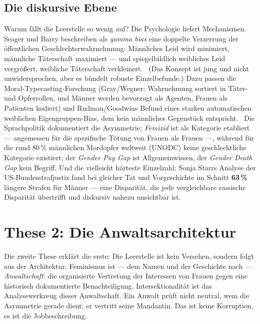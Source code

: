 \subsection{Die diskursive Ebene}

Warum fällt die Leerstelle so wenig auf? Die Psychologie liefert Mechanismen.
Seager und Barry beschreiben als \emph{gamma bias} eine doppelte Verzerrung
der öffentlichen Geschlechterwahrnehmung: Männliches Leid wird minimiert,
männliche Täterschaft maximiert --- und spiegelbildlich weibliches Leid
vergrößert, weibliche Täterschaft verkleinert. \umstritten\ (Das Konzept ist
jung und nicht unwidersprochen, aber es bündelt robuste Einzelbefunde.)
Dazu passen die Moral-Typecasting-Forschung (Gray/Wegner: Wahrnehmung sortiert
in Täter- und Opferrollen, und Männer werden bevorzugt als Agenten, Frauen als
Patienten kodiert) und Rudman/Goodwins Befund eines starken automatischen
weiblichen Eigengruppen-Bias, dem kein männliches Gegenstück entspricht.
\belegt\ Die Sprachpolitik dokumentiert die Asymmetrie: \emph{Femizid} ist als
Kategorie etabliert --- angemessen für die spezifische Tötung von Frauen als
Frauen ---, während für die rund 80\,\% männlichen Mordopfer weltweit (UNODC)
keine geschlechtliche Kategorie existiert; der \emph{Gender Pay Gap} ist
Allgemeinwissen, der \emph{Gender Death Gap} kein Begriff. Und die vielleicht
härteste Einzelzahl: Sonja Starrs Analyse der US-Bundesstrafjustiz fand bei
gleicher Tat und Vorgeschichte im Schnitt \textbf{63\,\%} längere Strafen für
Männer --- eine Disparität, die jede vergleichbare rassische Disparität
übertrifft und diskursiv nahezu unsichtbar ist. \belegt

\section{These 2: Die Anwaltsarchitektur}

Die zweite These erklärt die erste: Die Leerstelle ist kein Versehen, sondern
folgt aus der Architektur. Feminismus ist --- dem Namen und der Geschichte nach
--- \emph{Anwaltschaft}: die organisierte Vertretung der Interessen von Frauen
gegen eine historisch dokumentierte Benachteiligung. Intersektionalität ist
das Analysewerkzeug dieser Anwaltschaft. Ein Anwalt prüft nicht neutral, wem
die Asymmetrie gerade dient; er vertritt seine Mandantin. Das ist keine
Korruption, es ist die Jobbeschreibung.

